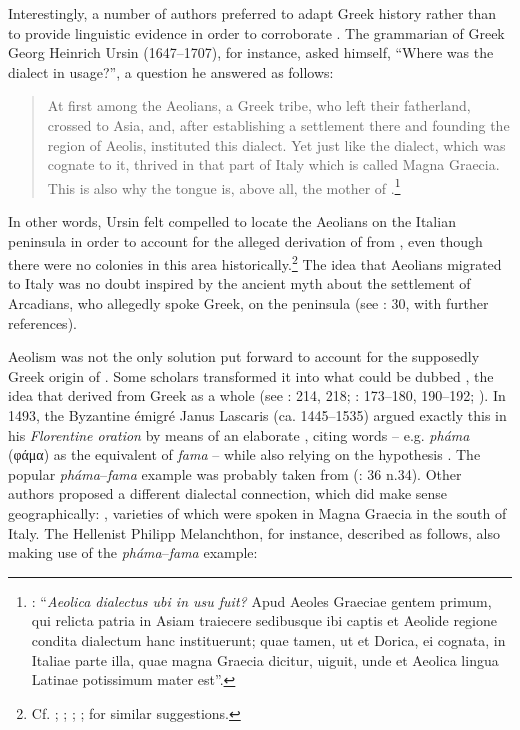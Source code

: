 Interestingly, a number of authors preferred to adapt Greek history rather than to provide linguistic evidence in order to corroborate . The grammarian of Greek Georg Heinrich Ursin (1647–1707), for instance, asked himself, “Where was the  dialect in usage?”, a question he answered as follows:

\begin{quote}
At first among the Aeolians, a Greek tribe, who left their fatherland, crossed to Asia, and, after establishing a settlement there and founding the region of Aeolis, instituted this dialect. Yet just like the  dialect, which was cognate to it,  thrived in that part of Italy which is called Magna Graecia. This is also why the  tongue is, above all, the mother of .\footnote{\citet[509]{Ursin1691}: “\textit{Aeolica dialectus ubi in usu fuit?} Apud Aeoles Graeciae gentem primum, qui relicta patria in Asiam traiecere sedibusque ibi captis et Aeolide regione condita dialectum hanc instituerunt; quae tamen, ut et Dorica, ei cognata, in Italiae parte illa, quae magna Graecia dicitur, uiguit, unde et Aeolica lingua Latinae potissimum mater est”.}
\end{quote}

In other words, Ursin felt compelled to locate the Aeolians on the Italian peninsula in order to account for the alleged derivation of  from , even though there were no  colonies in this area historically.\footnote{Cf. \citet[289]{[schulze]1711}; \citet[\textsc{i}.69]{Ten1723}; \citet[30]{Munthe1748}; \citet[89]{Facius1782}; \citet[199]{Ries1786} for similar suggestions.} The idea that Aeolians migrated to Italy was no doubt inspired by the ancient myth about the settlement of Arcadians, who allegedly spoke  Greek, on the peninsula (see \citealt{Lamers2019}: 30, with further references).

Aeolism was not the only solution put forward to account for the supposedly Greek origin of . Some scholars transformed it into what could be dubbed , the idea that  derived from Greek as a whole (see \citealt{Tavoni1986}: 214, 218; \citealt{Lamers2015}: 173–180, 190–192; \citeyear{Lamers2019}). In 1493, the Byzantine émigré Janus Lascaris (ca. 1445–1535) argued exactly this in his \textit{Florentine oration} by means of an elaborate , citing  words – e.g. \textit{pháma} (φάμα) as the equivalent of  \textit{fama} – while also relying on the  hypothesis \citep[179]{Lamers2015}. The popular \textit{pháma}–\textit{fama} example was probably taken from  (\citealt{Lamers2019}: 36 n.34). Other authors proposed a different dialectal connection, which did make sense geographically: , varieties of which were spoken in Magna Graecia in the south of Italy. The  Hellenist Philipp Melanchthon, for instance, described  as follows, also making use of the \textit{pháma}–\textit{fama} example:

